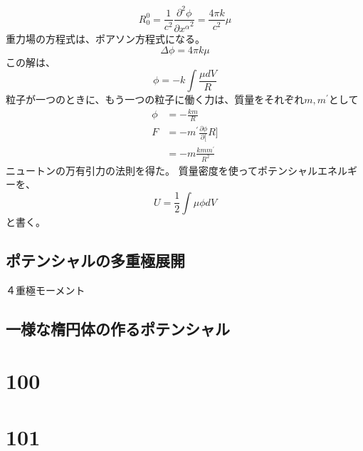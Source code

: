 \documentclass{jsarticle}
\newcommand{\pder}[2][]{\frac{\partial#1}{\partial#2}}
\newcommand{\ppder}[2][]{\frac{\partial^2#1}{{\partial#2}^2}}
\newcommand{\half}{\frac{1}{2}}
\newcommand{\beq}{\begin{equation}}
\newcommand{\eeq}{\end{equation}}
\begin{document}
\beq
R^0_0 = \frac{1}{c^2} \ppder[\phi]{{x^\alpha}} = \frac{4\pi k}{c^2} \mu
\eeq
重力場の方程式は、ポアソン方程式になる。
\beq
    \Delta  \phi = 4 \pi k \mu
\eeq
この解は、
\beq
    \phi = -k \int \frac{\mu dV}{R}
\eeq
粒子が一つのときに、もう一つの粒子に働く力は、質量をそれぞれ$m,m^\prime$として
\begin{align}
    \phi &= - \frac{km}{R}\\
    F &= - m^\prime \pder[\phi][R]\\
      &= -m \frac{kmm^\prime}{R^2}
\end{align}
ニュートンの万有引力の法則を得た。
質量密度を使ってポテンシャルエネルギーを、
\beq
U = \half \int \mu \phi dV
\eeq
と書く。
\subsection{ポテンシャルの多重極展開}

４重極モーメント
\subsection{一様な楕円体の作るポテンシャル}

\section{100}
\section{101}
\end{document}
